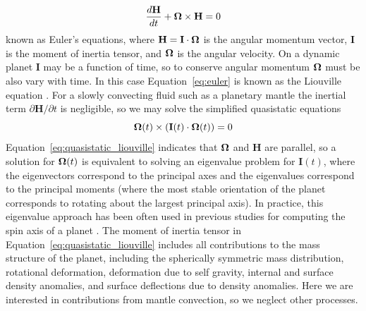 \documentclass[extra,mreferee]{gji}
\begin{document}
\begin{equation}
\frac{d \mathbf{H}}{dt} + \mitbf{\Omega} \times \mathbf{H} = 0
\label{eq:euler}
\end{equation}
known as Euler's equations, where $\mathbf{H} = \mathbf{I} \cdot \mitbf{\Omega}$ is the angular momentum vector, $\mathbf{I}$ is the moment of inertia tensor, and $\mitbf{\Omega}$ is the angular velocity.
On a dynamic planet $\mathbf{I}$ may be a function of time, so to conserve angular momentum $\mitbf{\Omega}$ must be also vary with time.
In this case Equation~\eqref{eq:euler} is known as the Liouville equation \citep[e.g.][]{munk1960rotation}.
For a slowly convecting fluid such as a planetary mantle the inertial term $\partial \mathbf{H} / \partial t$ is negligible, so we may solve the simplified quasistatic equations
\begin{equation}
\mitbf{\Omega } (t)\times ( \mathbf{I}(t) \cdot \mitbf{\Omega }(t) ) = 0
\label{eq:quasistatic_liouville}
\end{equation}
Equation~\eqref{eq:quasistatic_liouville} indicates that $\mitbf{\Omega}$ and $\mathbf{H}$ are parallel, so a solution for $\mitbf{\Omega}(t)$ is equivalent to solving an eigenvalue problem for $\mathbf{I}(t)$, where the eigenvectors correspond to the principal axes and the eigenvalues correspond to the principal moments (where the most stable orientation of the planet corresponds to rotating about the largest principal axis).
In practice, this eigenvalue approach has been often used in previous studies for computing the spin axis of a planet \citep[e.g.][]{steinberger1997changes, roberts2007cause}.
The moment of inertia tensor in Equation~\eqref{eq:quasistatic_liouville} includes all contributions to the mass structure
of the planet, including the spherically symmetric mass distribution, rotational deformation, deformation due to self gravity, internal and surface density anomalies, and surface deflections due to density anomalies.
Here we are interested in contributions from mantle convection, so we neglect other processes.
\end{document}
